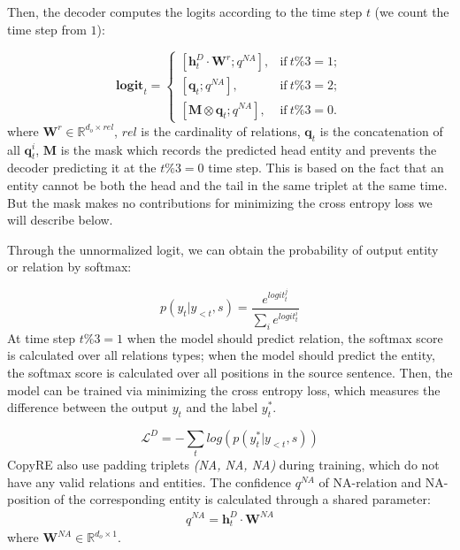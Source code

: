 \documentclass[letterpaper]{article} \usepackage{aaai20}  \usepackage{times}  \usepackage{helvet} \usepackage{courier}  \usepackage[hyphens]{url}  \usepackage{graphicx}
\begin{document}
      
      Then, the decoder computes the logits according to the time step $t$ (we count the time step from $1$):

      \begin{equation}
      \bm{logit}_t = \begin{cases}
      [\bm{h}^D_t \cdot \bm{W}^r;q^{NA}],& \text{if} \ t\%3=1; \\
      [\bm{q}_t;q^{NA}],& \text{if} \ t\%3=2; \\
      [\bm{M} \otimes \bm{q}_t;q^{NA}],& \text{if} \ t\%3=0.
      \end{cases}
      \label{eq:mask}
      \end{equation}
      where $\bm{W}^{r} \in \mathbb{R}^{d_o \times rel}$, $rel$ is the cardinality of relations, $\bm{q}_t$ is the concatenation of all $\bm{q}_t^i$, $\bm{M}$ is the mask which records the predicted head entity and prevents the decoder predicting it at the $t\%3=0$ time step. This is based on the fact that an entity cannot be both the head and the tail in the same triplet at the same time. But the mask makes no contributions for minimizing the cross entropy loss we will describe below.


      
      Through the unnormalized logit, we can obtain the probability of output entity or relation by softmax:
      
      \begin{equation}
      p(y_t|y_{<t}, s) = \frac{e^{logit^j_t}}{\sum_i e^{logit^i_t}}
      \end{equation}
      At time step $t\%3=1$ when the model should predict relation, the softmax score is calculated over all relations types; when the model should predict the entity, the softmax score is calculated over all positions in the source sentence.
      Then, the model can be trained via minimizing the cross entropy loss, which measures the difference between the output $y_t$ and the label $y_t^*$.
      
      \begin{equation}
      \mathcal{L}^D = - \sum_t log(p(y_t^*|y_{<t}, s))
      \label{eq:lossd}
      \end{equation}
CopyRE also use padding triplets \textit{(NA, NA, NA)} during training,
      which do not have any valid relations and entities. The confidence $q^{NA}$ of NA-relation and NA-position of the corresponding entity is calculated through a shared parameter:
      \begin{align}
      q^{NA} = \bm{h}^D_t \cdot \bm{W}^{NA} \label{eq:na}
      \end{align}
      where $\bm{W}^{NA} \in \mathbb{R}^{d_o \times 1}$.
  
\end{document}
